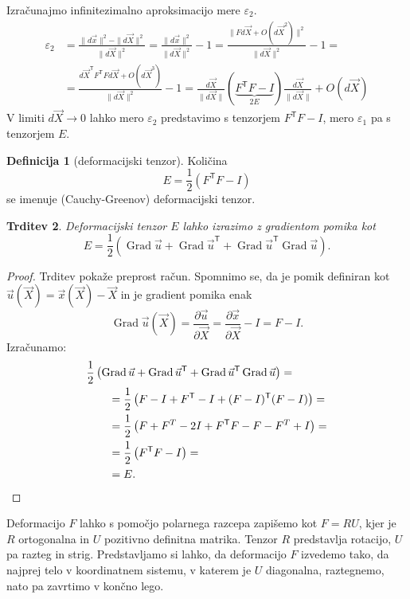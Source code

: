 \documentclass[12pt,a4paper,twoside]{article}
\theoremstyle{definition} %
\newtheorem{definicija}{Definicija}[section]
\theoremstyle{plain} %
\newtheorem{trditev}[definicija]{Trditev}
\numberwithin{equation}{section}
\newcommand{\T}{\mathsf{T}}
\newcommand{\Grad}{\operatorname{Grad}}
\newcommand{\eps}{\varepsilon}
\newcommand{\dpar}[2]{\ensuremath{\frac{\partial #1}{\partial #2}}}
\newcommand{\vu}{\vec{u}}
\newcommand{\vX}{\vec{X}}
\newcommand{\vx}{\vec{x}}
\begin{document}
Izračunajmo infinitezimalno aproksimacijo mere $\eps_2$.
\begin{align}
  \eps_2 &=
  \frac{\|d\vx\|^2 - \|d\vX\|^2}{\|d\vX\|^2} =
  \frac{\|d\vx\|^2}{\|d\vX\|^2}  - 1=
  \frac{\|F d\vX + O(d\vX^2)\|^2}{\|d\vX\|^2} - 1 = \nonumber \\ &=
  \frac{d\vX^\T F^\T F d\vX + O(d\vX^3)}{\|d\vX\|^2} - 1 =
  \frac{d\vX}{\|d\vX\|}(\underbrace{F^\T F - I}_{2E})\frac{d\vX}{\|d\vX\|} + O(d\vX)
\end{align}
V limiti $d\vX \to 0$ lahko mero $\eps_2$ predstavimo s tenzorjem $F^\T F- I$,
mero $\eps_1$ pa s tenzorjem $E$.

\begin{definicija}[deformacijski tenzor]
  Količina
  \begin{equation}
    E = \frac12 (F^\T F - I)
  \end{equation}
  se imenuje (Cauchy-Greenov) deformacijski tenzor.
\end{definicija}
\begin{trditev}
  Deformacijski tenzor $E$ lahko izrazimo z gradientom pomika kot
  \begin{equation}
    \label{eq:strain-tensor}
    E = \frac12\left( \Grad \vu + \Grad \vu^\T + \Grad \vu^\T \Grad \vu \right).
  \end{equation}
\end{trditev}
\begin{proof}
Trditev pokaže preprost račun. Spomnimo se, da je pomik definiran kot $\vu(\vX) =
\vx(\vX) - \vX$ in je gradient pomika enak
\[ \Grad \vu(\vX) = \dpar{\vu}{\vX} = \dpar{\vx}{\vX} - I = F - I. \]
Izračunamo:
\begin{align*}
  &\frac12\left( \Grad \vu + \Grad \vu^\T + \Grad \vu^\T \Grad \vu \right) = \\
  &\qquad=\frac12\left(F - I + F^\T - I  + (F-I)^\T(F-I)\right) = \\
  &\qquad=\frac12\left(F + F^T - 2I + F^\T F - F - F^T + I\right) = \\
  &\qquad=\frac12\left(F^\T F - I\right) = \\
  &\qquad=E.\qedhere
\end{align*}
\end{proof}

Deformacijo $F$ lahko s pomočjo polarnega razcepa zapišemo kot $F = RU$, kjer je
$R$ ortogonalna in $U$ pozitivno definitna matrika. Tenzor $R$ predstavlja
rotacijo, $U$ pa razteg in strig. Predstavljamo si lahko, da deformacijo $F$
izvedemo tako, da najprej telo v koordinatnem sistemu, v katerem je $U$ diagonalna,
raztegnemo, nato pa zavrtimo v končno lego.
\end{document}
